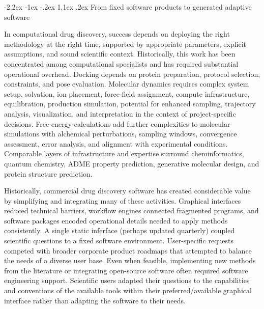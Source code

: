 \documentclass[11pt]{article}
\makeatletter
\renewcommand\section{\@startsection{section}{1}{\z@}%
  {-2.2ex \@plus -1ex \@minus -.2ex}%
  {1.1ex \@plus .2ex}%
  {\normalfont\Large\bfseries\color{molblue}}}
\makeatother
\begin{document}
\section{From fixed software products to generated adaptive software}

In computational drug discovery, success depends on deploying the right methodology at the right time, supported by appropriate parameters, explicit assumptions, and sound scientific context. Historically, this work has been concentrated among computational specialists and has required substantial operational overhead. Docking depends on protein preparation, protocol selection, constraints, and pose evaluation. Molecular dynamics requires complex system setup, solvation, ion placement, force-field assignment, compute infrastructure, equilibration, production simulation, potential for enhanced sampling, trajectory analysis, visualization, and interpretation in the context of project-specific decisions. Free-energy calculations add further complexities to  molecular simulations with alchemical perturbations, sampling windows, convergence assessment, error analysis, and alignment with experimental conditions. Comparable layers of infrastructure and expertise surround cheminformatics, quantum chemistry, ADME property prediction, generative molecular design, and protein structure prediction.

Historically, commercial drug discovery software has created considerable value by simplifying and integrating many of these activities. Graphical interfaces reduced technical barriers, workflow engines connected fragmented programs, and software packages encoded operational details needed to apply methods consistently. A single static inferface (perhaps updated quarterly) coupled scientific questions to a fixed software environment. User-specific requests competed with broader corporate product roadmaps that attempted to balance the needs of a diverse user base. Even when feasible, implementing new methods from the literature or integrating open-source software often required software engineering support. Scientific users adapted their questions to the capabilities and conventions of the available tools within their preferred/available graphical interface rather than adapting the software to their needs.
\end{document}
